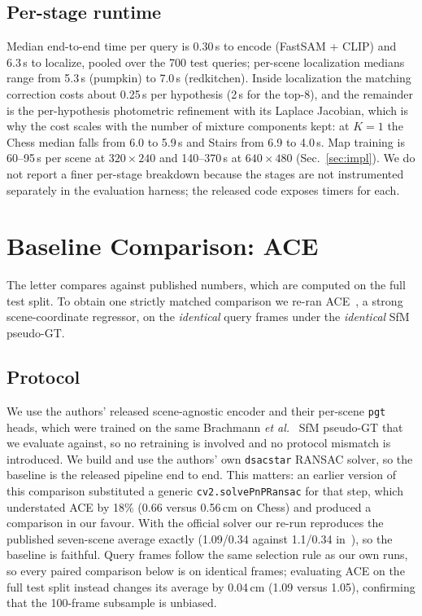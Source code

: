 \documentclass[journal]{IEEEtran}
\begin{document}
\subsection{Per-stage runtime}
Median end-to-end time per query is 0.30\,s to encode (FastSAM + CLIP) and 6.3\,s to localize, pooled over the 700 test queries; per-scene localization medians range from 5.3\,s (pumpkin) to 7.0\,s (redkitchen). Inside localization the matching correction costs about 0.25\,s per hypothesis (2\,s for the top-8), and the remainder is the per-hypothesis photometric refinement with its Laplace Jacobian, which is why the cost scales with the number of mixture components kept: at $K{=}1$ the Chess median falls from 6.0 to 5.9\,s and Stairs from 6.9 to 4.0\,s. Map training is 60--95\,s per scene at $320{\times}240$ and 140--370\,s at $640{\times}480$ (Sec.~\ref{sec:impl}). We do not report a finer per-stage breakdown because the stages are not instrumented separately in the evaluation harness; the released code exposes timers for each.

\section{Baseline Comparison: ACE}
\label{sec:ace}
The letter compares against published numbers, which are computed on the
full test split. To obtain one strictly matched comparison we re-ran
ACE~\cite{ace}, a strong scene-coordinate regressor, on the \emph{identical}
query frames under the \emph{identical} SfM pseudo-GT.

\subsection{Protocol}
We use the authors' released scene-agnostic encoder and their per-scene
\texttt{pgt} heads, which were trained on the same Brachmann
\emph{et al.}~\cite{brachmann2021dslam} SfM pseudo-GT that we evaluate
against, so no retraining is involved and no protocol mismatch is
introduced. We build and use the authors' own \texttt{dsacstar} RANSAC solver, so the
baseline is the released pipeline end to end. This matters: an earlier
version of this comparison substituted a generic \texttt{cv2.solvePnPRansac}
for that step, which understated ACE by 18\% (0.66 versus 0.56\,cm on
Chess) and produced a comparison in our favour. With the official solver our
re-run reproduces the published seven-scene average exactly
(1.09/0.34 against 1.1/0.34 in~\cite{ace}), so the baseline is faithful.
Query frames follow the same selection rule as our own runs, so every
paired comparison below is on identical frames; evaluating ACE on the full
test split instead changes its average by 0.04\,cm (1.09 versus 1.05),
confirming that the 100-frame subsample is unbiased.
\end{document}
